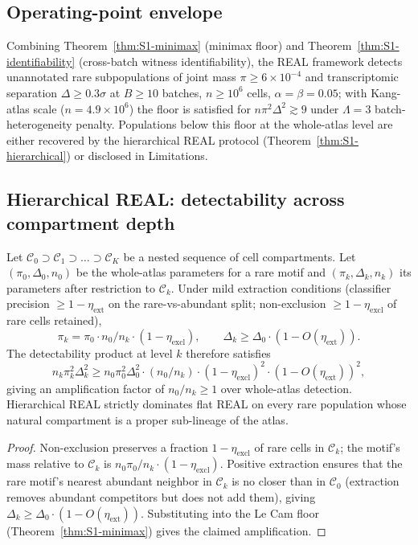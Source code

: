\subsection{Operating-point envelope}
\label{sec:S1-envelope}\label{sec:power-floor-envelope}\label{sec:power-floor}

Combining Theorem~\ref{thm:S1-minimax} (minimax floor) and Theorem~\ref{thm:S1-identifiability} (cross-batch witness identifiability), the REAL framework detects unannotated rare subpopulations of joint mass $\pi\geq 6\times 10^{-4}$ and transcriptomic separation $\Delta\geq 0.3\sigma$ at $B\geq 10$ batches, $n\geq 10^{6}$ cells, $\alpha=\beta=0.05$; with Kang-atlas scale ($n=4.9\times 10^{6}$) the floor is satisfied for $n\pi^{2}\Delta^{2}\gtrsim 9$ under $\Lambda=3$ batch-heterogeneity penalty. Populations below this floor at the whole-atlas level are either recovered by the hierarchical REAL protocol (Theorem~\ref{thm:S1-hierarchical}) or disclosed in Limitations.

\subsection{Hierarchical REAL: detectability across compartment depth}
\label{sec:S1-hierarchical}

\begin{theorem}
\label{thm:S1-hierarchical}
Let $\mathcal{C}_{0}\supset \mathcal{C}_{1}\supset\dots\supset\mathcal{C}_{K}$ be a nested sequence of cell compartments. Let $(\pi_{0}, \Delta_{0}, n_{0})$ be the whole-atlas parameters for a rare motif and $(\pi_{k}, \Delta_{k}, n_{k})$ its parameters after restriction to $\mathcal{C}_{k}$. Under mild extraction conditions (classifier precision $\geq 1-\eta_{\text{ext}}$ on the rare-vs-abundant split; non-exclusion $\geq 1-\eta_{\text{excl}}$ of rare cells retained),
\[
  \pi_{k} = \pi_{0}\cdot n_{0}/n_{k}\cdot (1-\eta_{\text{excl}}),
  \qquad
  \Delta_{k}\geq \Delta_{0}\cdot (1-O(\eta_{\text{ext}})).
\]
The detectability product at level $k$ therefore satisfies
\[
  n_{k}\pi_{k}^{2}\Delta_{k}^{2}\geq n_{0}\pi_{0}^{2}\Delta_{0}^{2}\cdot (n_{0}/n_{k})\cdot (1-\eta_{\text{excl}})^{2}\cdot (1-O(\eta_{\text{ext}}))^{2},
\]
giving an amplification factor of $n_{0}/n_{k}\geq 1$ over whole-atlas detection. Hierarchical REAL strictly dominates flat REAL on every rare population whose natural compartment is a proper sub-lineage of the atlas.
\end{theorem}

\begin{proof}
Non-exclusion preserves a fraction $1-\eta_{\text{excl}}$ of rare cells in $\mathcal{C}_{k}$; the motif's mass relative to $\mathcal{C}_{k}$ is $n_{0}\pi_{0}/n_{k}\cdot (1-\eta_{\text{excl}})$. Positive extraction ensures that the rare motif's nearest abundant neighbor in $\mathcal{C}_{k}$ is no closer than in $\mathcal{C}_{0}$ (extraction removes abundant competitors but does not add them), giving $\Delta_{k}\geq \Delta_{0}\cdot (1-O(\eta_{\text{ext}}))$. Substituting into the Le Cam floor (Theorem~\ref{thm:S1-minimax}) gives the claimed amplification.
\end{proof}

